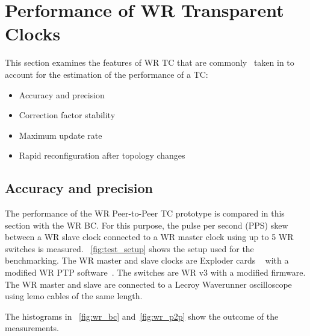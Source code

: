 \section{Performance of WR Transparent Clocks}
\label{sec:issues}
This section examines the features of WR TC that are commonly~\cite{biblio:tc_perf} taken in to
account for the estimation of the performance of a TC: 
\begin{itemize}
    \item Accuracy and precision
    \item Correction factor stability
    \item Maximum update rate
    \item Rapid reconfiguration after topology changes
\end{itemize}


\subsection{Accuracy and precision}


The performance of the WR Peer-to-Peer TC prototype is compared in this section
with the WR BC. For this purpose, the pulse per second (PPS) skew between a WR slave clock 
connected to a WR master clock using up to 5 WR switches is measured.
\figurename~\ref{fig:test_setup} shows the setup used for the benchmarking. 
The WR master and slave clocks are Exploder cards
~\cite{biblio:wr_gsi} with a modified WR PTP software~\cite{biblio:wrpc-sw}.
The switches are WR v3 with a modified firmware. The WR master and slave
are connected to a Lecroy Waverunner oscilloscope using lemo cables of the 
same length. 

The histograms in \figurename~\ref{fig:wr_bc} and~\ref{fig:wr_p2p} show the outcome of the
measurements.

